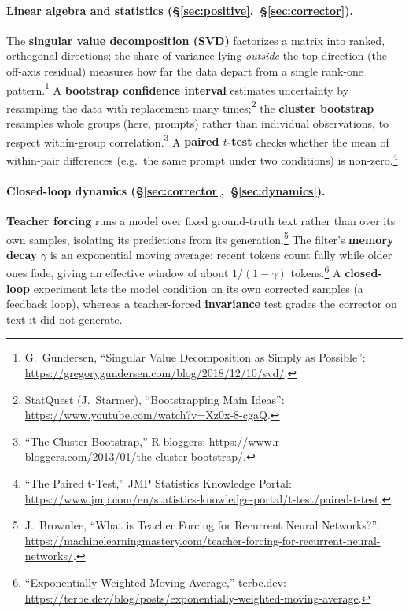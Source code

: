 \documentclass[11pt]{article}
\begin{document}
\paragraph{Linear algebra and statistics (\S\ref{sec:positive},~\S\ref{sec:corrector}).}
The \textbf{singular value decomposition (SVD)} factorizes a matrix into ranked,
orthogonal directions; the share of variance lying \emph{outside} the top direction
(the off-axis residual) measures how far the data depart from a single rank-one
pattern.\footnote{G.~Gundersen, ``Singular Value Decomposition as Simply as
Possible'': \url{https://gregorygundersen.com/blog/2018/12/10/svd/}.} A
\textbf{bootstrap confidence interval} estimates uncertainty by resampling the data
with replacement many times;\footnote{StatQuest (J.~Starmer), ``Bootstrapping Main
Ideas'': \url{https://www.youtube.com/watch?v=Xz0x-8-cgaQ}.} the \textbf{cluster
bootstrap} resamples whole groups (here, prompts) rather than individual
observations, to respect within-group correlation.\footnote{``The Cluster
Bootstrap,'' R-bloggers:
\url{https://www.r-bloggers.com/2013/01/the-cluster-bootstrap/}.} A \textbf{paired
$t$-test} checks whether the mean of within-pair differences (e.g.\ the same prompt
under two conditions) is non-zero.\footnote{``The Paired t-Test,'' JMP Statistics
Knowledge Portal:
\url{https://www.jmp.com/en/statistics-knowledge-portal/t-test/paired-t-test}.}

\paragraph{Closed-loop dynamics (\S\ref{sec:corrector},~\S\ref{sec:dynamics}).}
\textbf{Teacher forcing} runs a model over fixed ground-truth text rather than over
its own samples, isolating its predictions from its
generation.\footnote{J.~Brownlee, ``What is Teacher Forcing for Recurrent Neural
Networks?'':
\url{https://machinelearningmastery.com/teacher-forcing-for-recurrent-neural-networks/}.}
The filter's \textbf{memory decay} $\gamma$ is an exponential moving average:
recent tokens count fully while older ones fade, giving an effective window of about
$1/(1-\gamma)$ tokens.\footnote{``Exponentially Weighted Moving Average,''
terbe.dev: \url{https://terbe.dev/blog/posts/exponentially-weighted-moving-average}.}
A \textbf{closed-loop} experiment lets the model condition on its own corrected
samples (a feedback loop), whereas a teacher-forced \textbf{invariance} test grades
the corrector on text it did not generate.

\end{document}
